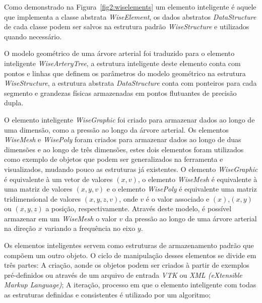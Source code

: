 Como demonstrado na Figura~\ref{fig2:wiselements} um elemento inteligente é aquele que implementa a classe abstrata \textit{WiseElement}, os dados abstratos \textit{DataStructure} de cada classe podem ser salvos na estrutura padrão \textit{WiseStructure} e utilizados quando necessário. 

O modelo geométrico de uma árvore arterial foi traduzido para o elemento inteligente \textit{WiseArteryTree}, a estrutura inteligente deste elemento conta com pontos e linhas que definem os parâmetros do modelo geométrico na estrutura \textit{WiseStructure}, a estrutura abstrata \textit{DataStructure} conta com ponteiros para cada segmento e grandezas físicas armazenadas em pontos flutuantes de precisão dupla.


O elemento inteligente \textit{WiseGraphic} foi criado para armazenar dados ao longo de uma dimensão, como a pressão ao longo da árvore arterial. Os elementos \textit{WiseMesh} e \textit{WisePoly} foram criados para armazenar dados ao longo de duas dimensões e ao longo de três dimensões, estes dois elementos foram utilizados como exemplo de objetos que podem ser generalizados na ferramenta e visualizados, mudando pouco as estruturas já existentes. O elemento \textit{WiseGraphic} é equivalente à um vetor de valores $(x,v)$, o elemento \textit{WiseMesh} é equivalente à uma matriz de valores $(x,y,v)$ e o elemento \textit{WisePoly} é equivalente uma matriz tridimensional de valores $(x,y,z,v)$, onde $v$ é o valor associado e $(x)$,$(x,y)$ ou $(x,y,z)$ a posição, respectivamente. Através deste modelo, é possível armazenar em um \textit{WiseMesh} o valor $v$ da pressão ao longo de uma árvore arterial na direção $x$ variando a frequência no eixo $y$.

Os elementos inteligentes servem como estruturas de armazenamento padrão que compõem um outro objeto. O ciclo de manipulação desses elementos se divide em três partes: A criação, aonde os objetos podem ser criados à partir de exemplos pré-definidos ou através de um arquivo de entrada \textit{VTK} ou \textit{XML (eXtensible Markup Language)}; A iteração, processo em que o elemento inteligente com todas as estruturas definidas e consistentes é utilizado por um algoritmo; 

